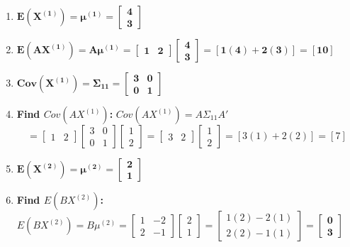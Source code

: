 \documentclass[11pt,letterpaper]{article}
\begin{document}
\begin{enumerate}
    \item[(a)] $\mathbf{E(X^{(1)}) = \mu^{(1)} = \begin{bmatrix} 4 \\ 3 \end{bmatrix}}$
    \item[(b)] $\mathbf{E(AX^{(1)}) = A \mu^{(1)} = \begin{bmatrix} 1 & 2 \end{bmatrix} \begin{bmatrix} 4 \\ 3 \end{bmatrix} = [1(4) + 2(3)] = [10]}$
    \item[(c)] $\mathbf{Cov(X^{(1)}) = \Sigma_{11} = \begin{bmatrix} 3 & 0 \\ 0 & 1 \end{bmatrix}}$
    \item[(d)] \textbf{Find $Cov(AX^{(1)})$:} 
    $Cov(AX^{(1)}) = A \Sigma_{11} A'$
    $$= \begin{bmatrix} 1 & 2 \end{bmatrix} \begin{bmatrix} 3 & 0 \\ 0 & 1 \end{bmatrix} \begin{bmatrix} 1 \\ 2 \end{bmatrix} = \begin{bmatrix} 3 & 2 \end{bmatrix} \begin{bmatrix} 1 \\ 2 \end{bmatrix} = [3(1) + 2(2)] = [7]$$
    \item[(e)] $\mathbf{E(X^{(2)}) = \mu^{(2)} = \begin{bmatrix} 2 \\ 1 \end{bmatrix}}$
    \item[(f)] \textbf{Find $E(BX^{(2)})$:}
    $E(BX^{(2)}) = B \mu^{(2)} = \begin{bmatrix} 1 & -2 \\ 2 & -1 \end{bmatrix} \begin{bmatrix} 2 \\ 1 \end{bmatrix} = \begin{bmatrix} 1(2) - 2(1) \\ 2(2) - 1(1) \end{bmatrix} = \mathbf{\begin{bmatrix} 0 \\ 3 \end{bmatrix}}$

\end{enumerate}
\end{document}
